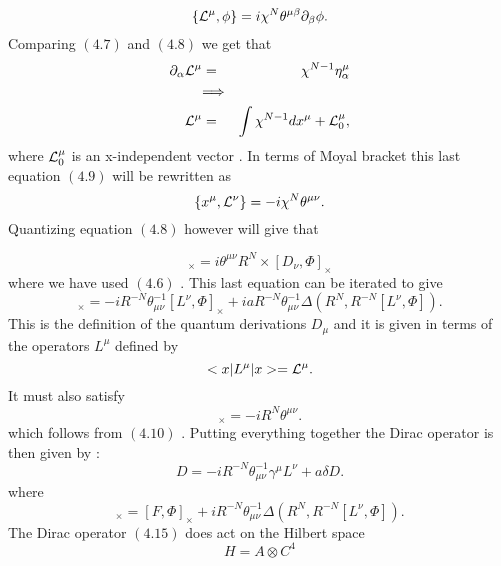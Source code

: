 \documentclass[a4paper,12pt]{article}
\begin{document}
\begin{equation}
\{{\cal
L}^{\mu},\phi\}=i{\chi}^N{\theta}^{{\mu}{\beta}}{\partial}_{\beta}\phi.
\end{equation}
Comparing $(4.7)$ and $(4.8)$ we get that
\begin{eqnarray}
{\partial}_{\alpha}{\cal L}^{\mu}&=&{\chi}^{N-1}{\eta}_{\alpha}^{\mu}\nonumber\\
&{\Longrightarrow}&\nonumber\\
 {\cal L}^{\mu}&=& \int {\chi}^{N-1}dx^{\mu} + {\cal L}^{\mu}_{0},
\end{eqnarray}
where ${\cal L}^{\mu}_0$ is an x-independent vector . In terms of
Moyal bracket this last equation $(4.9)$ will be rewritten as
\begin{equation}
\{x^{\mu},{\cal L}^{\nu}\}=-i{\chi}^{N}{\theta}^{{\mu}{\nu}}.
\end{equation}
Quantizing equation $(4.8)$ however will give that

\begin{equation}
[L^{\mu},\Phi]_{\times}=i{\theta}^{{\mu}{\nu}}R^N{\times}[D_{\nu},{\Phi}]_{\times}
\end{equation}
where we have used $(4.6)$ . This last equation can be iterated
to give
\begin{equation}
[D_{\mu},\Phi]_{\times}=-iR^{-N}{\theta}^{-1}_{{\mu}{\nu}}[L^{\nu},\Phi]_{\times}
+
iaR^{-N}{\theta}^{-1}_{{\mu}{\nu}}{\Delta}(R^N,R^{-N}[L^{\nu},\Phi]).
\end{equation}
This is the definition of the quantum derivations $D_{\mu}$ and
it is given in terms of the operators $L^{\mu}$ defined by
\begin{equation}
<x|L^{\mu}|x>={\cal L}^{\mu}.
\end{equation}
It must also satisfy
\begin{equation}
[X^{\mu},L^{\nu}]_{\times}=-iR^{N}{\theta}^{{\mu}{\nu}}.
\end{equation}
which follows from $(4.10)$ . Putting everything together the
Dirac operator is then given by :
\begin{equation}
D=-iR^{-N}{\theta}^{-1}_{{\mu}{\nu}}{\gamma}^{\mu}L^{\nu} +
a{\delta}D.
\end{equation}
where
\begin{equation}
[{\delta}D,\Phi]_{\times}=[F,\Phi]_{\times}+iR^{-N}{\theta}^{-1}_{{\mu}{\nu}}{\Delta}(R^N,R^{-N}[L^{\nu},\Phi]).
\end{equation}
The Dirac operator $(4.15)$ does act on the Hilbert space
\begin{equation}
H=A{\otimes}{C}^4
\end{equation}
\end{document}
